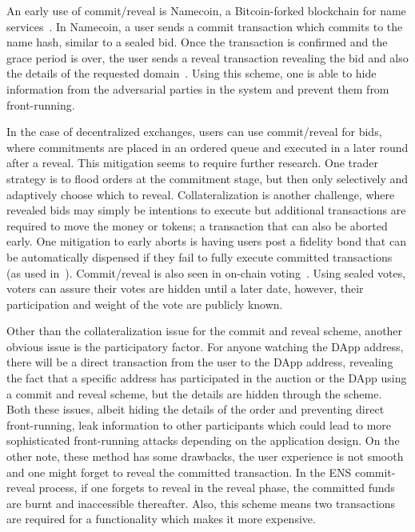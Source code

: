 An early use of commit/reveal is Namecoin, a Bitcoin-forked blockchain for name services~\cite{kalodner2015empirical}. In Namecoin, a user sends a commit transaction which commits to the name hash, similar to a sealed bid. Once the transaction is confirmed and the grace period is over, the user sends a reveal transaction revealing the bid and also the details of the requested domain~\cite{kalodner2015empirical}. Using this scheme, one is able to hide information from the adversarial parties in the system and prevent them from front-running. 

In the case of decentralized exchanges, users can use commit/reveal for bids, where commitments are placed in an ordered queue and executed in a later round after a reveal. This mitigation seems to require further research. One trader strategy is to flood orders at the commitment stage, but then only selectively and adaptively choose which to reveal. Collateralization is another challenge, where revealed bids may simply be intentions to execute but additional transactions are required to move the money or tokens; a transaction that can also be aborted early. One mitigation to early aborts is having users post a fidelity bond that can be automatically dispensed if they fail to fully execute committed transactions (as used in~\cite{mccorry2017smart}). Commit/reveal is also seen in on-chain voting~\cite{adChainPLCRVoting}. Using sealed votes, voters can assure their votes are hidden until a later date, however, their participation and weight of the vote are publicly known. 

Other than the collateralization issue for the commit and reveal scheme, another obvious issue is the participatory factor. For anyone watching the DApp address, there will be a direct transaction from the user to the DApp address, revealing the fact that a specific address has participated in the auction or the DApp using a commit and reveal scheme, but the details are hidden through the scheme. Both these issues, albeit hiding the details of the order and preventing direct front-running, leak information to other participants which could lead to more sophisticated front-running attacks depending on the application design. On the other note, these method has some drawbacks, the user experience is not smooth and one might forget to reveal the committed transaction. In the ENS commit-reveal process, if one forgets to reveal in the reveal phase, the committed funds are burnt and inaccessible thereafter. Also, this scheme means two transactions are required for a functionality which makes it more expensive.

